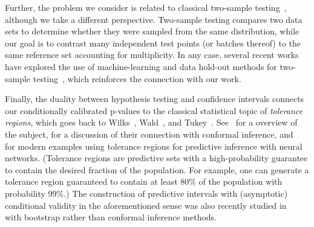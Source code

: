 Further, the problem we consider is related to classical two-sample testing~\cite{wilcoxon1992individual}, although we take a different perspective. Two-sample testing {compares} two data sets to determine whether they were sampled from the same distribution, while our goal is to {contrast} many independent test points (or batches thereof) to the same reference set accounting for {multiplicity}. In any case, several recent works have explored the use of machine-learning and data hold-out methods for two-sample testing~{\cite{friedman2004multivariate,lopez2017revisiting,kuchibhotla2020exchangeability,hu2020distributionfree,kim2021classification}}, which reinforces the connection with our work.

Finally, the duality between hypothesis testing and confidence intervals connects our conditionally calibrated p-values to the classical statistical topic of \emph{tolerance regions}, which goes back to Wilks~\cite{wilks1941, wilks1942}, Wald~\cite{wald1943}, and Tukey~\cite{tukey1947}. {See~\cite{krishnamoorthy2009statistical} for a overview of the subject, \cite{vovk2012conditional} for a discussion of their connection with conformal inference, and~\cite{Park2020PAC,bates2021distributionfree} for modern examples using tolerance regions for predictive inference with neural networks.} (Tolerance regions are predictive sets with a high-probability guarantee to contain the desired fraction of the population. For example, one can generate a tolerance region guaranteed to contain at least 80\% of the population with probability 99\%.{)}
{The construction of predictive intervals with (asymptotic) conditional validity in the aforementioned sense was also recently studied in~\cite{zhang2020bootstrap} with bootstrap rather than conformal inference methods.}


